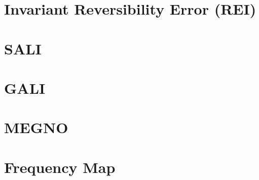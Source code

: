 \documentclass[10pt,a4paper]{article}
\begin{document}
\section{Invariant Reversibility Error (REI)}

\section{SALI}

\section{GALI}

\section{MEGNO}

\section{Frequency Map}
\end{document}

